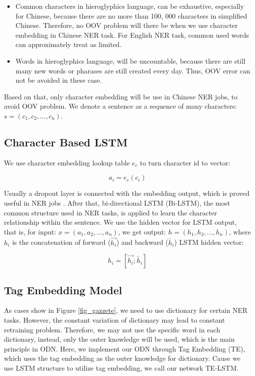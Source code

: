 \documentclass[letterpaper]{article} %
\begin{document}
\begin{itemize}
\item Common characters in hieroglyphics language, can be exhaustive, especially for Chinese, because there are no more than 100, 000 characters in simplified Chinese. Therefore, no OOV problem will there be when we use character embedding in Chinese NER task. For English NER task, common used words can approximately treat as limited.
\item Words in hieroglyphics language, will be uncountable, because there are still many new words or pharases are still created every day. Thus, OOV error can not be avoided in these case.
\end{itemize}

Based on that, only character embedding will be use in Chinese NER jobs, to avoid OOV problem. We denote a sentence as a sequence of many characters: $s = (c_1, c_2, ..., c_n)$.

\subsection{Character Based LSTM}

We use character embedding lookup table $e_c$ to turn character id to vector:

\begin{equation}
a_i = e_c(c_i) \label{char_embedding}
\end{equation}

Usually a dropout layer is connected with the embedding output, which is proved useful in NER jobs \cite{mahovy}. After that, bi-directional LSTM (Bi-LSTM), the most common structure used in NER tasks, is applied to learn the character relationship within the sentence. We use the hidden vector for LSTM output, that is, for input: $x = (a_1, a_2, ..., a_n) $,  we get output: $h = (h_1, h_2, ..., h_n)$, where $h_i$ is the concatenation of forward ($\overrightarrow{h_i}$) and backward ($\overleftarrow{h_i}$) LSTM hidden vector:

\begin{equation}
h_i = [\overrightarrow{h_i};\overleftarrow{h_i}] \label{lstm_out}
\end{equation}

\subsection{Tag Embedding Model}

As cases show in Figure \ref{fig_gazzete}, we need to use dictionary for certain NER tasks. However, the constant variation of dictionary may lead to constant retraining problem. Therefore, we may not use the specific word in each dictionary, instead, only the outer knowledge will be used, which is the main principle in ODN. Here, we implement our ODN through Tag Embedding (TE), which uses the tag embedding as the outer knowledge for dictionary. Cause we use LSTM structure to utilize tag embedding, we call our network TE-LSTM.
\end{document}

